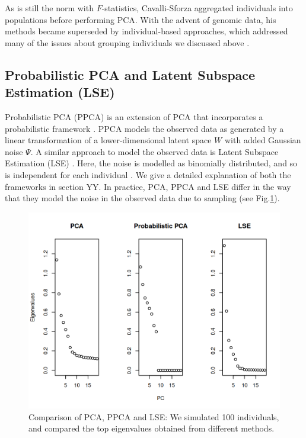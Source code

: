 \documentclass[12pt, letterpaper]{article}
\begin{document}
As is still the norm with $F$-statistics, Cavalli-Sforza aggregated individuals into populations before performing PCA. With the advent of genomic data, his methods became superseded by individual-based approaches, which addressed many of the issues about grouping individuals we discussed above \cite{patterson_population_2006, novembre_genes_2008, price_principal_2006}.


\subsection{Probabilistic PCA and Latent Subspace Estimation (LSE)}

Probabilistic PCA (PPCA) is an extension of PCA that incorporates a probabilistic framework \cite{tipping_probabilistic_nodate}. PPCA models the observed data as generated by a linear transformation of a lower-dimensional latent space $W$ with added Gaussian noise $\Psi$. A similar approach to model the observed data is Latent Subspace Estimation (LSE) \cite{cabreros_likelihood-free_2019}. Here, the noise is modelled as binomially distributed, and so is independent for each individual \cite{van_waaij_evaluation_2023, cabreros_likelihood-free_2019, chen_consistent_2015}. We give a detailed explanation of both the frameworks in section YY. In practice, PCA, PPCA and LSE differ in the way that they model the noise in the observed data due to sampling (see Fig.\ref{fig1:pca_ppca}). 

\begin{figure}[ht!]
    \includegraphics[width=16.5cm]{plots/pca_all_genetic.png}
    \centering
    \caption{Comparison of PCA, PPCA and LSE: We simulated 100 individuals, and compared the top eigenvalues obtained from different methods.}
    \label{fig1:pca_ppca}
\end{figure}
\end{document}
